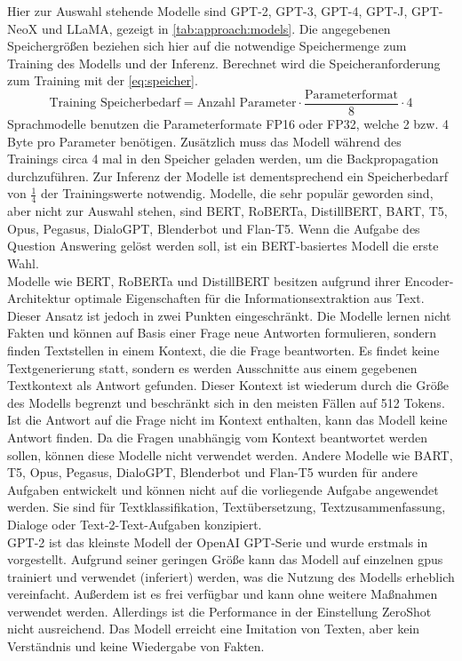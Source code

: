 Hier zur Auswahl stehende Modelle sind GPT-2, GPT-3, GPT-4, GPT-J, GPT-NeoX und LLaMA, gezeigt in \cref{tab:approach:models}.
Die angegebenen Speichergrößen beziehen sich hier auf die notwendige Speichermenge zum Training des Modells und der Inferenz.
Berechnet wird die Speicheranforderung zum Training mit der \cref{eq:speicher}.
\begin{equation}\label{eq:speicher}
    \text{Training Speicherbedarf}=\text{Anzahl Parameter} \cdot \frac{\text{Parameterformat}}{8} \cdot 4
\end{equation}
Sprachmodelle benutzen die Parameterformate FP16 oder FP32, welche 2 bzw. 4 Byte pro Parameter benötigen. Zusätzlich muss das Modell während des Trainings circa 4 mal in den Speicher geladen werden, um die Backpropagation durchzuführen. 
Zur Inferenz der Modelle ist dementsprechend ein Speicherbedarf von $\frac{1}{4}$ der Trainingswerte notwendig.
Modelle, die sehr populär geworden sind, aber nicht zur Auswahl stehen, sind BERT, RoBERTa, DistillBERT, BART, T5, Opus, Pegasus, DialoGPT, Blenderbot und Flan-T5.
Wenn die Aufgabe des Question Answering gelöst werden soll, ist ein BERT-basiertes Modell die erste Wahl.\\

Modelle wie BERT, RoBERTa und DistillBERT besitzen aufgrund ihrer Encoder-Architektur optimale Eigenschaften für die Informationsextraktion aus Text.
Dieser Ansatz ist jedoch in zwei Punkten eingeschränkt.
Die Modelle lernen nicht Fakten und können auf Basis einer Frage neue Antworten formulieren, sondern finden Textstellen in einem Kontext, die die Frage beantworten.
Es findet keine Textgenerierung statt, sondern es werden Ausschnitte aus einem gegebenen Textkontext als Antwort gefunden.
Dieser Kontext ist wiederum durch die Größe des Modells begrenzt und beschränkt sich in den meisten Fällen auf 512 Tokens.
Ist die Antwort auf die Frage nicht im Kontext enthalten, kann das Modell keine Antwort finden.
Da die Fragen unabhängig vom Kontext beantwortet werden sollen, können diese Modelle nicht verwendet werden.
Andere Modelle wie BART, T5, Opus, Pegasus, DialoGPT, Blenderbot und Flan-T5 wurden für andere Aufgaben entwickelt und können nicht auf die vorliegende Aufgabe angewendet werden.
Sie sind für Textklassifikation, Textübersetzung, Textzusammenfassung, Dialoge oder Text-2-Text-Aufgaben konzipiert.\\

GPT-2 ist das kleinste Modell der OpenAI GPT-Serie und wurde erstmals in \citet{gpt2} vorgestellt.
Aufgrund seiner geringen Größe kann das Modell auf einzelnen \ac{gpu}s trainiert und verwendet (inferiert) werden, was die Nutzung des Modells erheblich vereinfacht.
Außerdem ist es frei verfügbar und kann ohne weitere Maßnahmen verwendet werden.
Allerdings ist die Performance in der Einstellung ZeroShot nicht ausreichend.
Das Modell erreicht eine Imitation von Texten, aber kein Verständnis und keine Wiedergabe von Fakten.\\

